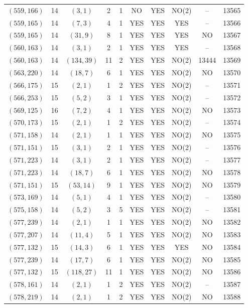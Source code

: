 \begin{longtable}{|c|c|c|c|c|c|c|c|c|c|}
$(559, 166)$ & 14 & $(3, 1)$ & 2 & 1 & NO & YES & NO(2) & -- & 13565\\
$(559, 165)$ & 14 & $(7, 3)$ & 4 & 1 & YES & YES & YES & -- & 13566\\
$(559, 165)$ & 14 & $(31, 9)$ & 8 & 1 & YES & YES & YES & NO & 13567\\
$(560, 163)$ & 14 & $(3, 1)$ & 2 & 1 & YES & YES & YES & -- & 13568\\
$(560, 163)$ & 14 & $(134, 39)$ & 11 & 2 & YES & YES & NO(2) & 13444 & 13569\\
$(563, 220)$ & 14 & $(18, 7)$ & 6 & 1 & YES & YES & NO(2) & NO & 13570\\
$(566, 175)$ & 15 & $(2, 1)$ & 1 & 2 & YES & YES & NO(2) & -- & 13571\\
$(566, 253)$ & 15 & $(5, 2)$ & 3 & 1 & YES & YES & NO(2) & -- & 13572\\
$(569, 125)$ & 16 & $(7, 2)$ & 4 & 1 & YES & YES & NO(2) & NO & 13573\\
$(570, 173)$ & 15 & $(2, 1)$ & 1 & 2 & YES & YES & NO(2) & -- & 13574\\
$(571, 158)$ & 14 & $(2, 1)$ & 1 & 1 & YES & YES & NO(2) & NO & 13575\\
$(571, 151)$ & 15 & $(3, 1)$ & 2 & 1 & YES & YES & NO(2) & -- & 13576\\
$(571, 223)$ & 14 & $(3, 1)$ & 2 & 1 & YES & YES & NO(2) & -- & 13577\\
$(571, 223)$ & 14 & $(18, 7)$ & 6 & 1 & YES & YES & NO(2) & NO & 13578\\
$(571, 151)$ & 15 & $(53, 14)$ & 9 & 1 & YES & YES & NO(2) & NO & 13579\\
$(573, 169)$ & 14 & $(5, 1)$ & 4 & 1 & YES & YES & NO(2) & -- & 13580\\
$(575, 158)$ & 14 & $(5, 2)$ & 3 & 5 & YES & YES & NO(2) & -- & 13581\\
$(577, 239)$ & 14 & $(2, 1)$ & 1 & 1 & YES & YES & NO(2) & NO & 13582\\
$(577, 207)$ & 14 & $(11, 4)$ & 5 & 1 & YES & YES & NO(2) & NO & 13583\\
$(577, 132)$ & 15 & $(14, 3)$ & 6 & 1 & YES & YES & YES & NO & 13584\\
$(577, 239)$ & 14 & $(17, 7)$ & 6 & 1 & YES & YES & NO(2) & NO & 13585\\
$(577, 132)$ & 15 & $(118, 27)$ & 11 & 1 & YES & YES & NO(2) & NO & 13586\\
$(578, 161)$ & 14 & $(2, 1)$ & 1 & 2 & YES & YES & NO(2) & -- & 13587\\
$(578, 219)$ & 14 & $(2, 1)$ & 1 & 2 & YES & YES & NO(2) & NO & 13588\\

\end{longtable}

